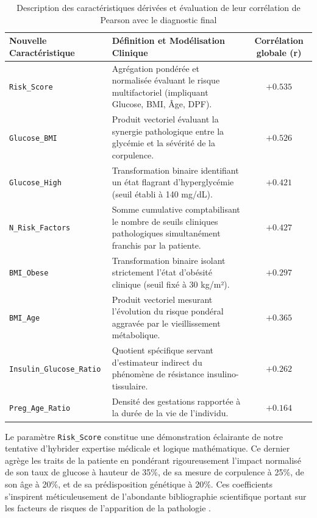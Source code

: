 \begin{table}[htbp]
    \centering
    \caption{Description des caractéristiques dérivées et évaluation de leur corrélation de Pearson avec le diagnostic final}
    \label{tab:feature_engineering}
    \small
    \begin{tabular}{p{5cm} p{6cm} c}
        \hline
        \textbf{Nouvelle Caractéristique} & \textbf{Définition et Modélisation Clinique} & \textbf{Corrélation globale (r)} \\
        \hline
        \texttt{Risk\_Score} & Agrégation pondérée et normalisée évaluant le risque multifactoriel (impliquant Glucose, BMI, Âge, DPF). & $+0.535$ \\
        \texttt{Glucose\_BMI} & Produit vectoriel évaluant la synergie pathologique entre la glycémie et la sévérité de la corpulence. & $+0.526$ \\
        \texttt{Glucose\_High} & Transformation binaire identifiant un état flagrant d'hyperglycémie (seuil établi à 140 mg/dL). & $+0.421$ \\
        \texttt{N\_Risk\_Factors} & Somme cumulative comptabilisant le nombre de seuils cliniques pathologiques simultanément franchis par la patiente. & $+0.427$ \\
        \texttt{BMI\_Obese} & Transformation binaire isolant strictement l'état d'obésité clinique (seuil fixé à 30 kg/m²). & $+0.297$ \\
        \texttt{BMI\_Age} & Produit vectoriel mesurant l'évolution du risque pondéral aggravée par le vieillissement métabolique. & $+0.365$ \\
        \texttt{Insulin\_Glucose\_Ratio} & Quotient spécifique servant d'estimateur indirect du phénomène de résistance insulino-tissulaire. & $+0.262$ \\
        \texttt{Preg\_Age\_Ratio} & Densité des gestations rapportée à la durée de la vie de l'individu. & $+0.164$ \\
        \hline
    \end{tabular}
\end{table}

Le paramètre \texttt{Risk\_Score} constitue une démonstration éclairante de notre tentative d'hybrider expertise médicale et logique mathématique. Ce dernier agrège les traits de la patiente en pondérant rigoureusement l'impact normalisé de son taux de glucose à hauteur de 35\%, de sa mesure de corpulence à 25\%, de son âge à 20\%, et de sa prédisposition génétique à 20\%. Ces coefficients s'inspirent méticuleusement de l'abondante bibliographie scientifique portant sur les facteurs de risques de l'apparition de la pathologie \citep{zou2018}.

